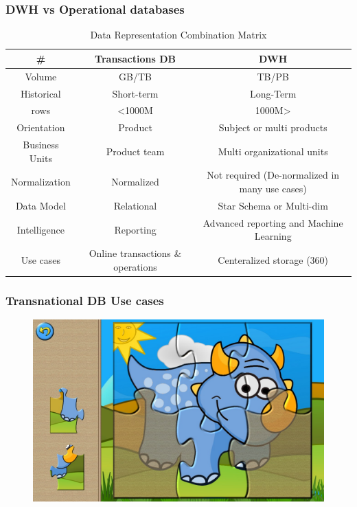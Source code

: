 
\begin{frame}
\frametitle{DWH vs Operational databases}


\begin{table}[t]
	\centering
	\begin{tabular}{c c c}
		\hline
		\textbf{\#}  & \textbf{Transactions DB}& \textbf{DWH} \\
		\hline
		Volume & GB/TB & TB/PB \\
		Historical  & Short-term & Long-Term\\
		rows & <1000M &  1000M>\\
		Orientation & Product & Subject or multi products\\
		Business Units & Product team & Multi organizational units\\
		Normalization & Normalized %
		 &  Not required (De-normalized in many use cases)\\
		 Data Model & Relational & Star Schema or Multi-dim\\
		 Intelligence&Reporting & Advanced reporting and Machine Learning\\
		 Use cases& Online transactions \& operations & Centeralized storage (360\textdegree)\\
		\hline
	\end{tabular}
	\caption{Data Representation Combination Matrix}\label{Tab:Data_Representation_Matrix}
\end{table}
\end{frame}



\begin{frame}
\frametitle{Transnational DB Use cases}
\begin{figure}[ht]

		\centering
		\includegraphics[width=\linewidth]{./Figures/chapter-01/baby-01.jpg}
\end{figure}
\end{frame}


